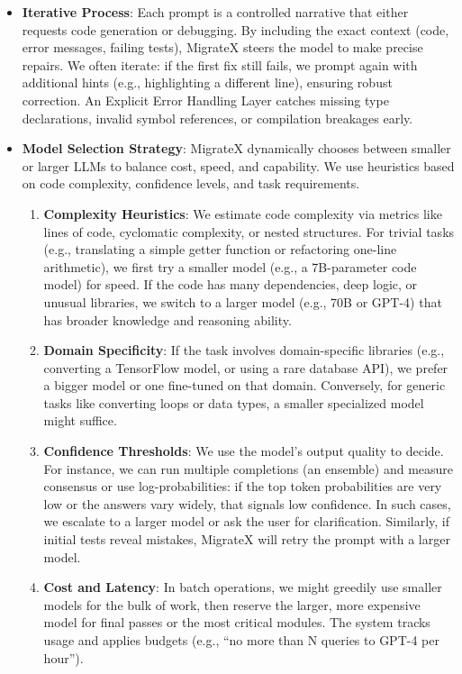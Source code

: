 \documentclass[twocolumn]{article}
\begin{document}
\begin{itemize}
    \item \textbf{Iterative Process}: Each prompt is a controlled narrative that either requests code generation or debugging. By including the exact context (code, error messages, failing tests), MigrateX steers the model to make precise repairs. We often iterate: if the first fix still fails, we prompt again with additional hints (e.g., highlighting a different line), ensuring robust correction. An Explicit Error Handling Layer catches missing type declarations, invalid symbol references, or compilation breakages early.

    \item \textbf{Model Selection Strategy}: MigrateX dynamically chooses between smaller or larger LLMs to balance cost, speed, and capability. We use heuristics based on code complexity, confidence levels, and task requirements.

    \begin{enumerate}
        \item \textbf{Complexity Heuristics}: We estimate code complexity via metrics like lines of code, cyclomatic complexity, or nested structures. For trivial tasks (e.g., translating a simple getter function or refactoring one-line arithmetic), we first try a smaller model (e.g., a 7B-parameter code model) for speed. If the code has many dependencies, deep logic, or unusual libraries, we switch to a larger model (e.g., 70B or GPT-4) that has broader knowledge and reasoning ability.

        \item \textbf{Domain Specificity}: If the task involves domain-specific libraries (e.g., converting a TensorFlow model, or using a rare database API), we prefer a bigger model or one fine-tuned on that domain. Conversely, for generic tasks like converting loops or data types, a smaller specialized model might suffice.

        \item \textbf{Confidence Thresholds}: We use the model’s output quality to decide. For instance, we can run multiple completions (an ensemble) and measure consensus or use log-probabilities: if the top token probabilities are very low or the answers vary widely, that signals low confidence. In such cases, we escalate to a larger model or ask the user for clarification. Similarly, if initial tests reveal mistakes, MigrateX will retry the prompt with a larger model.

        \item \textbf{Cost and Latency}: In batch operations, we might greedily use smaller models for the bulk of work, then reserve the larger, more expensive model for final passes or the most critical modules. The system tracks usage and applies budgets (e.g., ``no more than N queries to GPT-4 per hour'').


\end{enumerate}
\end{itemize}
\end{document}

